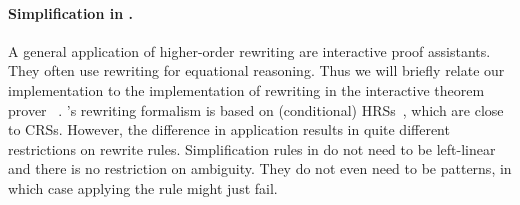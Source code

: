 \paragraph{Simplification in \Isabelle.} %
%
A general application of higher-order rewriting are interactive proof
assistants. They often use rewriting for equational reasoning. Thus we
will briefly relate our implementation to the implementation of
rewriting in the interactive theorem prover
\Isabelle~\cite{2002_nipkow_et_al}. \Isabelle's rewriting formalism
is based on (conditional) HRSs~\cite{1998_mayr-nipkow}, which are
close to CRSs.
%
However, the difference in application results in quite different
restrictions on rewrite rules.  Simplification rules in \Isabelle do
not need to be left-linear and there is no restriction on
ambiguity. They do not even need to be patterns, in which case
applying the rule might just fail.

